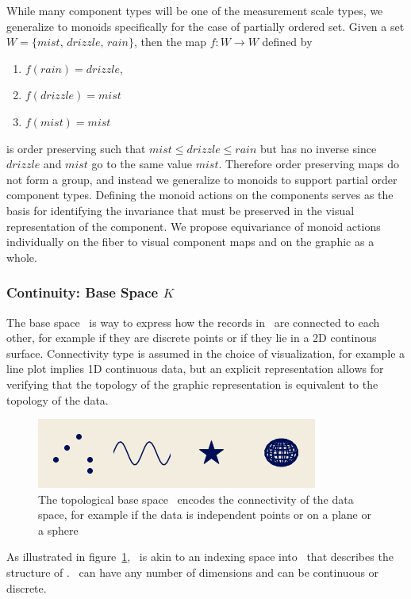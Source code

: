 \documentclass[../main.tex]{subfiles}
\begin{document}
While many component types will be one of the measurement scale types, we generalize to monoids specifically for the case of partially ordered set. Given a set $W=\{mist, \, drizzle, \, rain \}$, then the map $f: W\rightarrow W$ defined by 
\begin{enumerate}
    \item $f(rain) = drizzle$,
    \item  $f(drizzle) = mist$ 
    \item $f(mist) = mist$
\end{enumerate}
is order preserving such that $mist \leq drizzle \leq rain$ but has no inverse since $drizzle$ and $mist$ go to the same value $mist$. Therefore order preserving maps do not form a group, and instead we generalize to monoids to support partial order component types. Defining the monoid actions on the components serves as the basis for identifying the invariance\cite{kindlmann2014algebraic} that must be preserved in the visual representation of the component. We propose equivariance of monoid actions individually on the fiber to visual component maps and on the graphic as a whole.

\subsubsection{Continuity: Base Space $K$} 
\label{sec:data_base}
The base space \dbase\ is way to express how the records in \dtotal\ are connected to each other, for example if they are discrete points or if they lie in a 2D continous surface. Connectivity type is assumed in the choice of visualization, for example a line plot implies 1D continuous data, but an explicit representation allows for verifying that the topology of the graphic representation is equivalent to the topology of the data.  

\begin{figure}[H]
    \includegraphics[width=.5\textwidth]{figures/math/k_different_types.png}
    \caption{The topological base space \dbase\ encodes the connectivity of the data space, for example if the data is independent points or on a plane or a sphere}
    \label{fig:base_space_types}
\end{figure}
As illustrated in figure~\ref{fig:base_space_types}, \dbase\ is akin to an indexing space into \dtotal\ that describes the structure of \dtotal.  \dbase\ can have any number of dimensions and can be continuous or discrete. 
\end{document}
